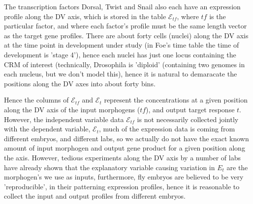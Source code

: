 The transcription factors Dorsal, Twist and Snail also each have an expression profile along the DV axis, which is stored in the table $\mathcal{E}_{tf}$, where $tf$ is the particular factor, and where each factor's profile must be the same length vector as the target gene profiles. There are about forty cells (nuclei) along the DV axis at the time point in development under study (in Foe's time table the time of development is 'stage 4'), hence each nuclei has just one locus containing the CRM of interest (technically, Drosophila is 'diploid' (containing two genomes in each nucleus, but we don't model this), hence it is natural to demaracate the positions along the DV axes into about forty bins.

Hence the columns of $\mathcal{E}_{tf}$ and $\mathcal{E}_{t}$ represent the concentrations at a given position along the DV axis of the input morphogens ($tf$), and output target response $t$.  However, the independent variable data $\mathcal{E}_{tf}$ is not necessarily collected jointly with the dependent variable, $\mathcal{E}_{t}$, much of the expression data is coming from different embryos, and different labs, so we actually do not have the exact known amount of input morphogen and output gene product for a given position along the axis.  However, tedious experiments along the DV axis by a number of labs have already shown that the explanatory variable causing variation in $E_{t}$ are the morphogen's we use as inputs, furthermore, fly embryos are believed to be very 'reproducible', in their patterning expression profiles, hence it is reasonable to collect the input and output profiles from different embryos.



